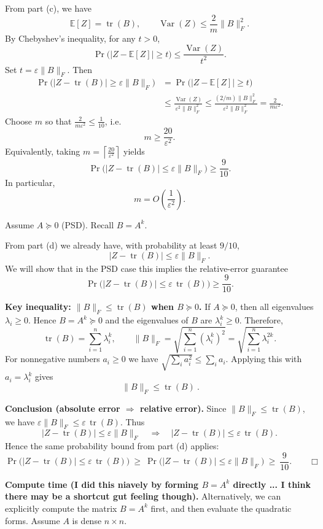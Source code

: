 \documentclass[10pt]{article}
\newcommand{\E}{\mathbb{E}}
\DeclareMathOperator{\Var}{Var}
\DeclareMathOperator{\tr}{tr}
\newcommand{\spara}[1]{\vspace{.5em}\noindent {\large\sffamily\textcolor{nyuOfficialPurple}{#1}}}
\begin{document}
From part (c), we have
\[
\E[Z]=\tr(B),
\qquad
\Var(Z)\le \frac{2}{m}\|B\|_F^2.
\]
By Chebyshev's inequality, for any $t>0$,
\[
\Pr\big(|Z-\E[Z]|\ge t\big)\le \frac{\Var(Z)}{t^2}.
\]
Set $t=\varepsilon\|B\|_F$. Then
\begin{align*}
\Pr\big(|Z-\tr(B)|\ge \varepsilon\|B\|_F\big)
&=
\Pr\big(|Z-\E[Z]|\ge t\big) \\
&\le
\frac{\Var(Z)}{\varepsilon^2\|B\|_F^2}
\le
\frac{(2/m)\|B\|_F^2}{\varepsilon^2\|B\|_F^2}
=
\frac{2}{m\varepsilon^2}.
\end{align*}
Choose $m$ so that $\frac{2}{m\varepsilon^2}\le \frac{1}{10}$, i.e.
\[
m \ge \frac{20}{\varepsilon^2}.
\]
Equivalently, taking $m=\left\lceil \frac{20}{\varepsilon^2}\right\rceil$ yields
\[
\Pr\big(|Z-\tr(B)|\le \varepsilon\|B\|_F\big)\ge \frac{9}{10}.
\]
In particular,
\[
\boxed{m=O\!\left(\frac{1}{\varepsilon^2}\right).}
\]

\medskip
\spara{Pr. 1(e)}

Assume $A\succeq 0$ (PSD). Recall $B=A^k$.

From part (d) we already have, with probability at least $9/10$,
\[
|Z-\tr(B)|\le \varepsilon \|B\|_F.
\]
We will show that in the PSD case this implies the relative-error guarantee
\[
\Pr\big(|Z-\tr(B)|\le \varepsilon\,\tr(B)\big)\ge \frac{9}{10}.
\]

\medskip
\textbf{Key inequality: $\|B\|_F \le \tr(B)$ when $B\succeq 0$.}
If $A\succeq 0$, then all eigenvalues $\lambda_i\ge 0$. Hence $B=A^k\succeq 0$ and the eigenvalues of $B$ are $\lambda_i^k\ge 0$.
Therefore,
\[
\tr(B)=\sum_{i=1}^n \lambda_i^k,
\qquad
\|B\|_F=\sqrt{\sum_{i=1}^n (\lambda_i^k)^2}
=\sqrt{\sum_{i=1}^n \lambda_i^{2k}}.
\]
For nonnegative numbers $a_i\ge 0$ we have $\sqrt{\sum_i a_i^2}\le \sum_i a_i$.
Applying this with $a_i=\lambda_i^k$ gives
\[
\boxed{\ \|B\|_F \le \tr(B)\ }.
\]

\medskip
\textbf{Conclusion (absolute error $\Rightarrow$ relative error).}
Since $\|B\|_F \le \tr(B)$, we have $\varepsilon\|B\|_F \le \varepsilon\,\tr(B)$. Thus
\[
|Z-\tr(B)|\le \varepsilon\|B\|_F
\quad\Longrightarrow\quad
|Z-\tr(B)|\le \varepsilon\,\tr(B).
\]
Hence the same probability bound from part (d) applies:
\[
\Pr\big(|Z-\tr(B)|\le \varepsilon\,\tr(B)\big)\ \ge\ \Pr\big(|Z-\tr(B)|\le \varepsilon\|B\|_F\big)\ \ge\ \frac{9}{10}.
\qquad \Box
\]

\medskip
\textbf{Compute time (I did this niavely by forming $B=A^k$ directly ... I think there may be a shortcut gut feeling though).}
Alternatively, we can explicitly compute the matrix $B=A^k$ first, and then evaluate the quadratic forms.
Assume $A$ is dense $n\times n$.
\end{document}
